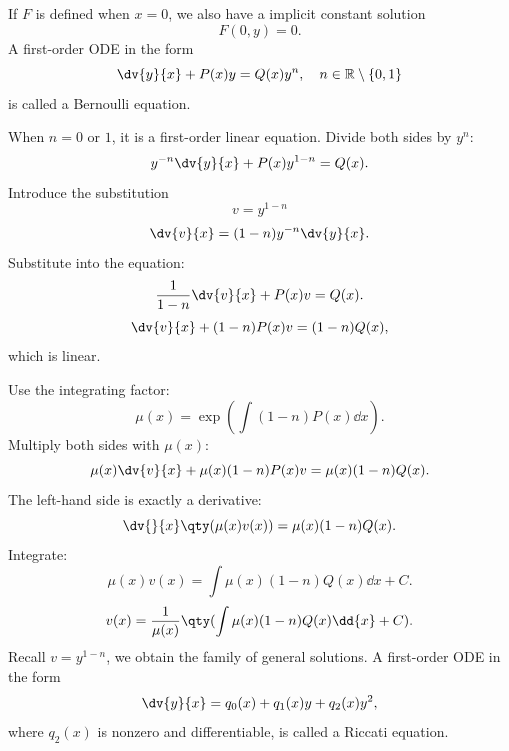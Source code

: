 \documentclass[a4paper,12pt]{report}
\begin{document}
If $F$ is defined when $x=0$, we also have a implicit constant solution
\[F(0,y)=0.\]
A first-order ODE in the form
\[\dv{y}{x}+P(x)y=Q(x)y^n,\quad n\in\mathbb{R}\setminus\{0,1\}\]
is called a Bernoulli equation.

When $n=0$ or $1$, it is a first-order linear equation.
Divide both sides by $y^n$:
\[y^{-n}\dv{y}{x}+P(x)y^{1-n}=Q(x).\]
Introduce the substitution
\[v=y^{1-n}\]
\[\dv{v}{x}=(1-n)y^{-n}\dv{y}{x}.\]
Substitute into the equation:
\[\frac{1}{1-n}\dv{v}{x}+P(x)v=Q(x).\]
\[\dv{v}{x}+(1-n)P(x)v=(1-n)Q(x),\]
which is linear.

Use the integrating factor:
\[\mu(x)=\exp(\int (1-n)P(x)\dd{x}).\]
Multiply both sides with $\mu(x)$:
\[\mu(x)\dv{v}{x}+\mu(x)(1-n)P(x)v=\mu(x)(1-n)Q(x).\]
The left-hand side is exactly a derivative:
\[\dv{}{x}\qty(\mu(x)v(x))=\mu(x)(1-n)Q(x).\]
Integrate:
\[\mu(x)v(x)=\int\mu(x)(1-n)Q(x)\dd{x}+C.\]
\[v(x)=\frac{1}{\mu(x)}\qty(\int\mu(x)(1-n)Q(x)\dd{x}+C).\]
Recall $v=y^{1-n}$, we obtain the family of general solutions.
A first-order ODE in the form
\[\dv{y}{x}=q_0(x)+q_1(x)y+q_2(x)y^2,\]
where $q_2(x)$ is nonzero and differentiable, is called a Riccati equation.
\end{document}
